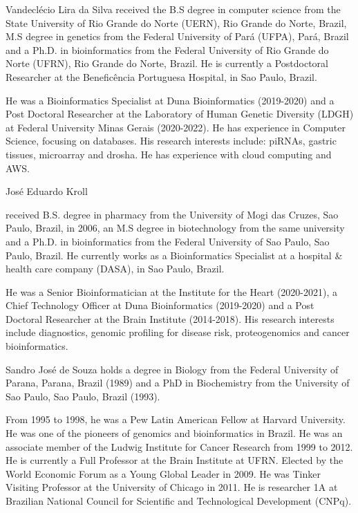 \documentclass{ieeeaccess}
\begin{document}
\begin{IEEEbiography}{Vandeclécio Lira da Silva} 
received the B.S degree in computer science from the State University of Rio Grande do Norte (UERN), Rio Grande do Norte, Brazil, M.S degree in genetics from the Federal University of Pará (UFPA), Pará, Brazil and a Ph.D. in bioinformatics from the Federal University of Rio Grande do Norte (UFRN), Rio Grande do Norte, Brazil. He is currently a Postdoctoral Researcher at the Beneficência Portuguesa Hospital, in Sao Paulo, Brazil. 

He was a Bioinformatics Specialist at Duna Bioinformatics (2019-2020) and a Post Doctoral Researcher at the Laboratory of Human Genetic Diversity (LDGH) at Federal University Minas Gerais (2020-2022). He has experience in Computer Science, focusing on databases. His research interests include: piRNAs, gastric tissues, microarray and drosha. He has experience with cloud computing and AWS. 
\end{IEEEbiography}

\begin{IEEEbiography}{José Eduardo Kroll} 

received B.S. degree in pharmacy from the University of Mogi das Cruzes, Sao Paulo, Brazil, in 2006, an M.S degree in biotechnology from the same university and a Ph.D. in bioinformatics from the Federal University of Sao Paulo, Sao Paulo, Brazil. He currently works as a Bioinformatics Specialist at a hospital \& health care company (DASA), in Sao Paulo, Brazil.

He was a Senior Bioinformatician at the Institute for the Heart (2020-2021), a Chief Technology Officer at Duna Bioinformatics (2019-2020) and a Post Doctoral Researcher at the Brain Institute (2014-2018). His research interests include diagnostics, genomic profiling for disease risk, proteogenomics and cancer bioinformatics.

\end{IEEEbiography}


\begin{IEEEbiography}{Sandro José de Souza} holds a degree in Biology from the Federal University of Parana, Parana, Brazil (1989) and a PhD in Biochemistry from the University of Sao Paulo, Sao Paulo, Brazil (1993). 

From 1995 to 1998, he was a Pew Latin American Fellow at Harvard University. He was one of the pioneers of genomics and bioinformatics in Brazil. He was an associate member of the Ludwig Institute for Cancer Research from 1999 to 2012. He is currently a Full Professor at the Brain Institute at UFRN. Elected by the World Economic Forum as a Young Global Leader in 2009. He was Tinker Visiting Professor at the University of Chicago in 2011. He is researcher 1A at Brazilian National Council for Scientific and Technological Development (CNPq).
\end{IEEEbiography}
\end{document}
